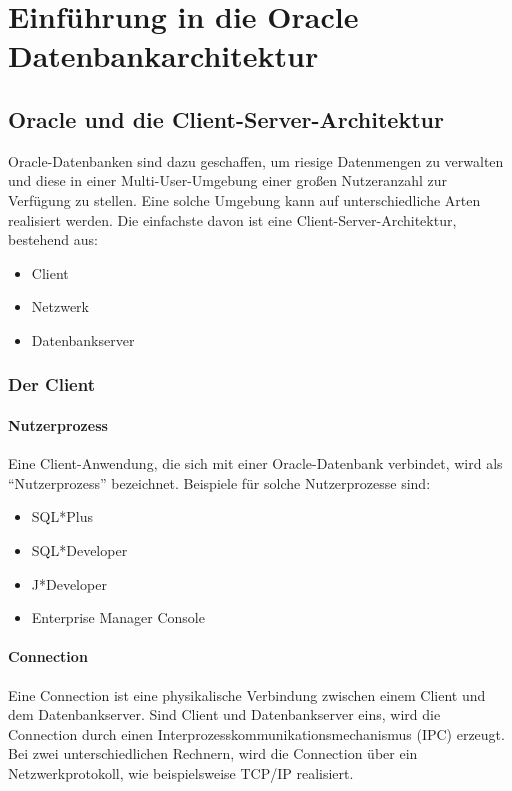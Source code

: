 \chapter{Einführung in die Oracle Datenbankarchitektur}
\chaptertoc{}
\cleardoubleevenpage

    \section{Oracle und die Client-Server-Architektur}
      Oracle-Datenbanken sind dazu geschaffen, um riesige Datenmengen zu verwalten und diese in einer Multi-User-Umgebung einer großen Nutzeranzahl zur Verfügung zu stellen. Eine solche Umgebung kann auf unterschiedliche Arten realisiert werden. Die einfachste davon ist eine  Client-Server-Architektur, bestehend aus:
      \begin{itemize}
        \item Client
        \item Netzwerk
        \item Datenbankserver
      \end{itemize}


      \subsection{Der Client}
        \subsubsection{Nutzerprozess}
          Eine Client-Anwendung, die sich mit einer Oracle-Datenbank verbindet, wird als \enquote{Nutzerprozess} bezeichnet. Beispiele für solche Nutzerprozesse sind:
          \begin{itemize}
            \item SQL*Plus
            \item SQL*Developer
            \item J*Developer
            \item Enterprise Manager Console
          \end{itemize}
        \subsubsection{Connection}
          Eine Connection ist eine physikalische Verbindung zwischen einem Client und dem Datenbankserver. Sind Client und Datenbankserver eins, wird die Connection durch einen Interprozesskommunikationsmechanismus (IPC) erzeugt. Bei zwei unterschiedlichen Rechnern, wird die Connection über ein Netzwerkprotokoll, wie beispielsweise TCP/IP realisiert.

